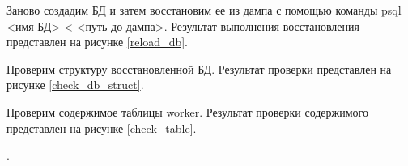 
Заново создадим БД и затем восстановим ее из дампа с помощью команды psql <имя БД> < <путь до дампа>. Результат выполнения восстановления представлен на рисунке \ref{reload_db}.


Проверим структуру восстановленной БД. Результат проверки представлен на рисунке \ref{check_db_struct}.


Проверим содержимое таблицы worker. Результат проверки содержимого представлен на рисунке \ref{check_table}.

.

